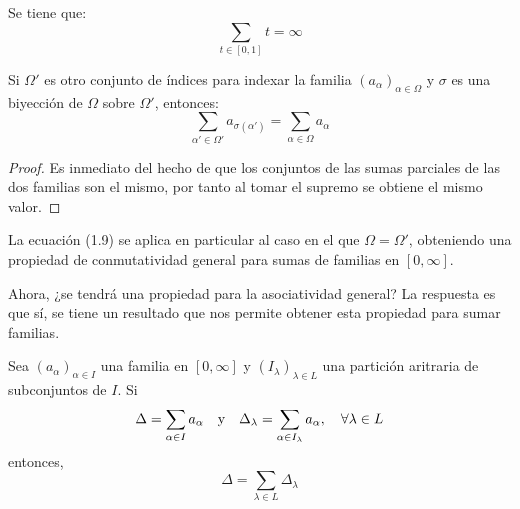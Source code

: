 \documentclass[12pt]{report}
\theoremstyle{largebreak}
\begin{document}
    \begin{exa}
        Se tiene que:
        \begin{equation*}
            \sum_{t\in[0,1]}t=\infty
        \end{equation*}
    \end{exa}

    \begin{propo}
        Si $\Omega'$ es otro conjunto de índices para indexar la familia $\left(a_\alpha\right)_{\alpha\in\Omega}$ y $\sigma$ es una biyección de $\Omega$ sobre $\Omega'$, entonces:
        \begin{equation}
            \sum_{\alpha'\in\Omega'}a_{\sigma(\alpha')}=\sum_{\alpha\in\Omega}a_\alpha
        \end{equation}
    \end{propo}

    \begin{proof}
        Es inmediato del hecho de que los conjuntos de las sumas parciales de las dos familias son el mismo, por tanto al tomar el supremo se obtiene el mismo valor.
    \end{proof}

    La ecuación (1.9) se aplica en particular al caso en el que $\Omega=\Omega'$, obteniendo una propiedad de conmutatividad general para sumas de familias en $[0,\infty]$.

    Ahora, ¿se tendrá una propiedad para la asociatividad general? La respuesta es que sí, se tiene un resultado que nos permite obtener esta propiedad para sumar familias.

    \begin{theor}
        Sea $\left(a_\alpha\right)_{\alpha\in I}$ una familia en $[0,\infty]$ y $\left(I_\lambda\right)_{\lambda\in L}$ una partición aritraria de subconjuntos de $I$. Si
        \begin{equation*}
            \Delta=\sum_{\alpha\in I}a_\alpha\quad\textup{y}\quad\Delta_\lambda=\sum_{\alpha\in I_\lambda}a_\alpha,\quad\forall\lambda\in L
        \end{equation*}
        entonces,
        \begin{equation*}
            \Delta=\sum_{\lambda\in L}\Delta_\lambda
        \end{equation*}
    \end{theor}
\end{document}
